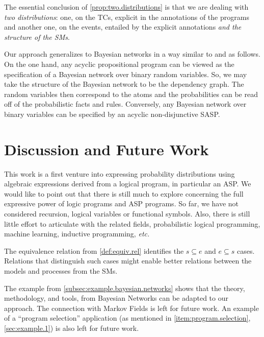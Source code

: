 \documentclass{tlp}
\renewcommand{\cite}{\citep}
\begin{document}
The essential conclusion of \cref{prop:two.distributions} is that we
are dealing with \emph{two distributions}: one, on the \aclp{TC},
explicit in the annotations of the programs and another one, on the
events, entailed by the explicit annotations \emph{and the structure
  of the \aclp{SM}}.

Our approach generalizes to Bayesian networks in a way similar to
\cite{cozman2020joy,raedt2016statistical} and
\cite{kiessling1992database,thone1997increased} as follows.  On the
one hand, any acyclic propositional program can be viewed as the
specification of a Bayesian network over binary random variables.  So,
we may take the structure of the Bayesian network to be the dependency
graph.  The random variables then correspond to the atoms and the
probabilities can be read off of the probabilistic facts and rules.
Conversely, any Bayesian network over binary variables can be
specified by an acyclic non-disjunctive \ac{SASP}.

%
%
%
\section{Discussion and Future Work}
%
%
%
This work is a first venture into expressing probability distributions
using algebraic expressions derived from a logical program, in
particular an \ac{ASP}.  We would like to point out that there is
still much to explore concerning the full expressive power of logic
programs and \ac{ASP} programs.  So far, we have not considered
recursion, logical variables or functional symbols.  Also, there is
still little effort to articulate with the related fields,
probabilistic logical programming, machine learning, inductive
programming, \emph{etc.}

The equivalence relation from \cref{def:equiv.rel} identifies the
$s \subseteq e$ and \(e \subseteq s\) cases.  Relations that
distinguish such cases might enable better relations between the
models and processes from the \aclp{SM}.

The example from \cref{subsec:example.bayesian.networks} shows that
the theory, methodology, and tools, from Bayesian Networks can be
adapted to our approach.  The connection with Markov Fields
\cite{kindermann80} is left for future work.  An example of a
``program selection'' application (as mentioned in
\cref{item:program.selection}, \cref{sec:example.1}) is also left for
future work.
\end{document}
